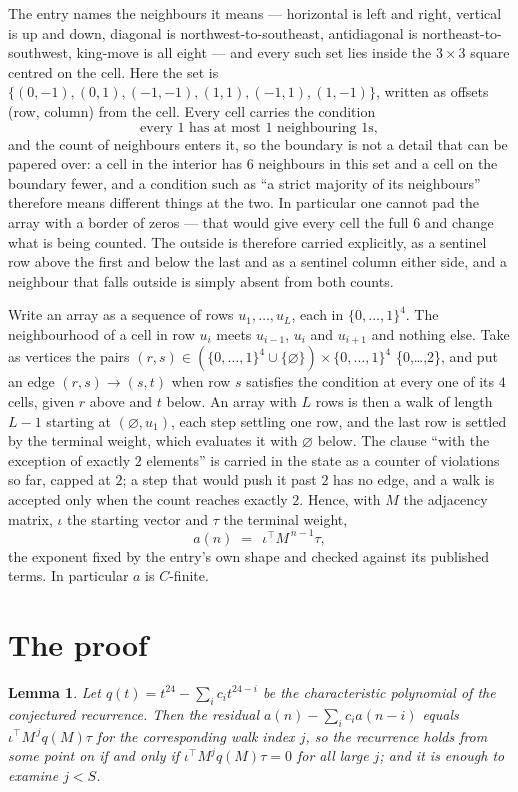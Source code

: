 \documentclass[11pt,a4paper]{article}
\theoremstyle{plain}
\newtheorem{lemma}[theorem]{Lemma}
\theoremstyle{definition}
\begin{document}
The entry names the neighbours it means --- horizontal is left and right, vertical is up and
down, diagonal is northwest-to-southeast, antidiagonal is northeast-to-southwest, king-move is
all eight --- and every such set lies inside the $3\times3$ square centred on the cell. Here
the set is $\{(0,-1), (0,1), (-1,-1), (1,1), (-1,1), (1,-1)\}$, written as offsets (row, column) from the cell. Every cell carries
the condition
\[
\text{every 1 has at most 1 neighbouring 1s},
\]
and the count of neighbours enters it, so the boundary is not a detail that can be papered
over: a cell in the interior has $6$ neighbours in this set and a cell on the boundary
fewer, and a condition such as ``a strict majority of its neighbours'' therefore means
different things at the two. In particular one cannot pad the array with a border of zeros ---
that would give every cell the full $6$ and change what is being counted. The outside is
therefore carried
explicitly, as a sentinel row above the first and below the last and as a sentinel column
either side, and a neighbour that falls outside is simply absent from both counts.

Write an array as a sequence of rows $u_1,\dots,u_L$, each in
$\{0,\dots,1\}^{4}$. The neighbourhood of a cell in row $u_i$ meets $u_{i-1}$,
$u_i$ and $u_{i+1}$ and nothing else. Take as vertices the pairs
$(r,s)\in(\{0,\dots,1\}^{4}\cup\{\varnothing\})\times\{0,\dots,1\}^{4}$ \times \{0,\dots,2\},
and put an edge $(r,s)\to(s,t)$ when row $s$ satisfies the condition at every one of its
$4$ cells, given $r$ above and $t$ below. An array with $L$ rows is then a walk of length
$L-1$ starting at $(\varnothing,u_1)$, each step settling one row, and the last row is
settled by the terminal weight, which evaluates it with $\varnothing$ below. The clause ``with the exception of exactly $2$ elements'' is carried in
the state as a counter of violations so far, capped at $2$; a step that would push it past
$2$ has no edge, and a walk is accepted only when the count reaches exactly $2$. Hence,
with $M$ the adjacency matrix, $\iota$ the starting vector and $\tau$ the terminal weight,
\[
a(n)\;=\;\,\iota^{\!\top}M^{\,n-1}\tau ,
\]
the exponent fixed by the entry's own shape and checked against its published terms. In
particular $a$ is $C$-finite.

\section{The proof}

\begin{lemma}\label{lem:crit}
Let $q(t)=t^{24}-\sum_i c_it^{24-i}$ be the characteristic polynomial of the
conjectured recurrence. Then the residual $a(n)-\sum_ic_ia(n-i)$ equals
$\iota^{\!\top}M^{\,j}q(M)\tau$ for the corresponding walk index $j$, so the
recurrence holds from some point on if and only if $\iota^{\!\top}M^{j}q(M)\tau=0$ for all
large $j$; and it is enough to examine $j<S$.
\end{lemma}
\end{document}
